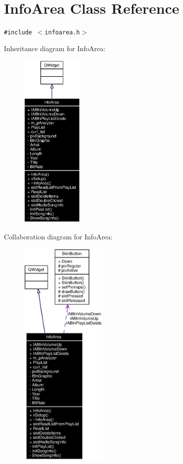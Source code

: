 \section{Info\-Area Class Reference}
\label{classInfoArea}
{\tt \#include $<$infoarea.h$>$}

Inheritance diagram for Info\-Area:\begin{figure}[H]
\begin{center}
\leavevmode
\includegraphics[width=87pt]{classInfoArea__inherit__graph}
\end{center}
\end{figure}
Collaboration diagram for Info\-Area:\begin{figure}[H]
\begin{center}
\leavevmode
\includegraphics[width=121pt]{classInfoArea__coll__graph}
\end{center}
\end{figure}


